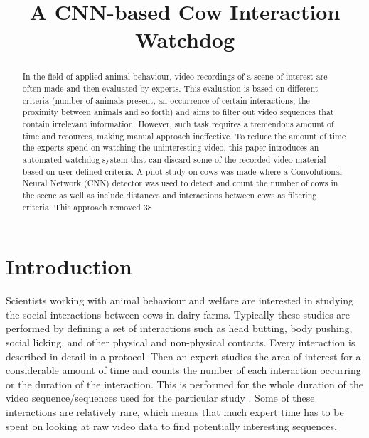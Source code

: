 \documentclass{cta-author}
\begin{document}
\title{A CNN-based Cow Interaction Watchdog}

\author{   }
\address{
}


\begin{abstract}
In the field of applied animal behaviour, video recordings of a scene of interest are often made and then evaluated by experts. This evaluation is based on different criteria (number of animals present, an occurrence of certain interactions, the proximity between animals and so forth) and aims to filter out video sequences that contain irrelevant information.  However,  such task requires a tremendous amount of time and resources, making manual approach ineffective. To reduce the amount of time the experts spend on watching the uninteresting video, this paper introduces an automated watchdog system that can discard some of the recorded video material based on user-defined criteria. A pilot study on cows was made where a Convolutional Neural Network (CNN) detector was used to detect and count the number of cows in the scene as well as include distances and interactions between cows as filtering criteria. This approach removed 38 %
\end{abstract}

\maketitle

\section{Introduction}

Scientists working with animal behaviour and welfare are interested in studying the social interactions between cows in dairy farms. Typically these studies are performed by defining a set of interactions such as head butting, body pushing, social licking, and other physical and non-physical contacts. Every interaction is described in detail in a protocol. Then an expert studies the area of interest for a considerable amount of time and counts the number of each interaction occurring or the duration of the interaction. This is performed for the whole duration of the video sequence/sequences used for the particular study \cite{MartinandBateson2007}. Some of these interactions are relatively rare, which means that much expert time has to be spent on looking at raw video data to find potentially interesting sequences.
\end{document}
